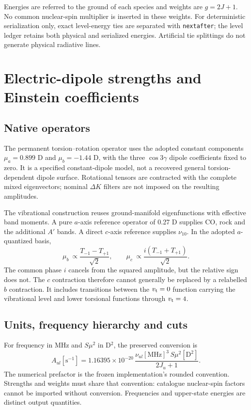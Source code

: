 \documentclass[11pt,a4paper]{article}
\newcommand{\vt}{v_{\rm t}}
\newcommand{\smu}{S\mu^2}
\begin{document}
Energies are referred to the ground of each species and weights are
$g=2J+1$. No common nuclear-spin multiplier is inserted in these weights.
For deterministic serialization only, exact level-energy ties are separated
with \texttt{nextafter}; the level ledger retains both physical and serialized
energies. Artificial tie splittings do not generate physical radiative lines.

\section{Electric-dipole strengths and Einstein coefficients}
\subsection{Native operators}
The permanent torsion--rotation operator uses the adopted constant components
$\mu_a=0.899$ D and $\mu_b=-1.44$ D, with the three
$\cos3\gamma$ dipole coefficients fixed to zero. It is a specified
constant-dipole model, not a recovered general torsion-dependent dipole surface.
Rotational tensors are contracted with the complete mixed eigenvectors;
nominal $\Delta K$ filters are not imposed on the resulting amplitudes.

The vibrational construction reuses ground-manifold eigenfunctions with
effective band moments. A pure $a$-axis reference operator of 0.27 D supplies
CO, rock and the additional $A'$ bands. A direct $c$-axis reference supplies
$\nu_{10}$. In the adopted $a$-quantized basis,
\begin{equation}
\mu_b\ \propto\frac{T_{-1}-T_{+1}}{\sqrt2},\qquad
\mu_c\ \propto\frac{i(T_{-1}+T_{+1})}{\sqrt2}.
\end{equation}
The common phase $i$ cancels from the squared amplitude, but the relative
sign does not. The $c$ contraction therefore cannot generally be replaced
by a relabelled $b$ contraction. It includes transitions between the $\vt=0$
function carrying the vibrational level and lower torsional functions through
$\vt=4$.

\subsection{Units, frequency hierarchy and cuts}
For frequency in MHz and $\smu$ in D$^2$, the preserved conversion is
\begin{equation}
A_{ul}[\mathrm{s}^{-1}]
=1.16395\times10^{-20}\,
\frac{\nu_{ul}[\mathrm{MHz}]^3\,\smu[\mathrm D^2]}{2J_u+1}.
\label{eq:einstein}
\end{equation}
The numerical prefactor is the frozen implementation's rounded convention.
Strengths and weights must share that convention: catalogue nuclear-spin
factors cannot be imported without conversion. Frequencies and upper-state
energies are distinct output quantities.
\end{document}
